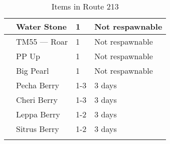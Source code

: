 \begin{longtable}{|| l l l l ||}%
\hline%
&Water Stone&1&Not respawnable\\%
\hline%
&TM55 — Roar&1&Not respawnable\\%
\hline%
&PP Up&1&Not respawnable\\%
\hline%
&Big Pearl&1&Not respawnable\\%
\hline%
&Pecha Berry&1{-}3&3 days\\%
\hline%
&Cheri Berry&1{-}3&3 days\\%
\hline%
&Leppa Berry&1{-}2&3 days\\%
\hline%
&Sitrus Berry&1{-}2&3 days\\%
\hline%
\endhead%
\hline%
\caption{Items in Route 213}%
\label{tab:Route213Items}%
\end{longtable}